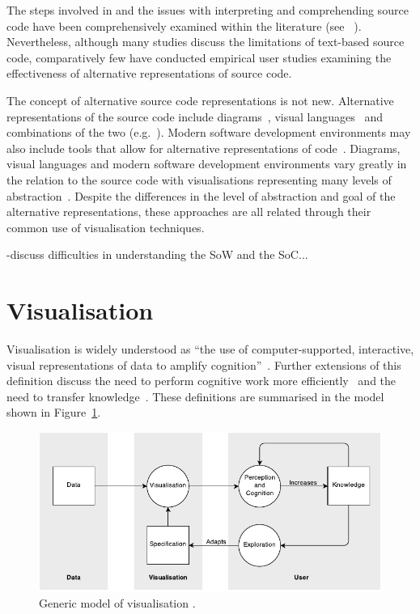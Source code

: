 The steps involved in and the issues with interpreting and comprehending source code have been comprehensively examined within the literature (see ~\cite{Novais2013,McLean2010a,Brooks1995,Desmond,Rajlich2002}). Nevertheless, although many studies discuss the limitations of text-based source code, comparatively few have conducted empirical user studies examining the effectiveness of alternative representations of source code.

The concept of alternative source code representations is not new. Alternative representations of the source code include diagrams~\cite{Rumbaugh2004}, visual languages~\cite{Cox2007} and combinations of the two (e.g.~\cite{Lucanin2011}). Modern software development environments may also include tools that allow for alternative representations of code~\cite{Cox2007}. Diagrams, visual languages and modern software development environments vary greatly in the relation to the source code with visualisations representing many levels of abstraction~\cite{Jerding1997}. Despite the differences in the level of abstraction and goal of the alternative representations, these approaches are all related through their common use of visualisation techniques.

-discuss difficulties in understanding the \ac{SoW} and the \ac{SoC}...

\section{Visualisation}

Visualisation is widely understood as ``the use of computer-supported, interactive, visual representations of data to amplify cognition''~\cite{Card1999}. Further extensions of this definition discuss the need to perform cognitive work more efficiently~\cite{Ware2013a} and the need to transfer knowledge~\cite{Burkhard}. These definitions are summarised in the model shown in Figure~\ref{fig:model-of-visualisation}.

\begin{figure}
  \centering \includegraphics[width=\columnwidth]{../images/diagrams/wijk-model-of-visualisation.pdf}
  \caption[Generic model of visualisation]{Generic model of visualisation \protect\cite{VanWijk2005}.}
\label{fig:model-of-visualisation}
\end{figure}

